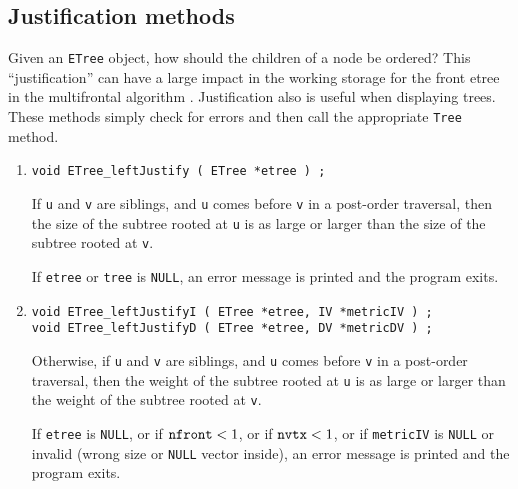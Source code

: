 \subsection{Justification methods}
\label{subsection:ETree:proto:justify}
\par
Given an {\tt ETree} object, 
how should the children of a node be ordered?
This ``justification'' can have a large impact in the working
storage for the front etree in the multifrontal algorithm
\cite{liu85-mfstorage}.
Justification also is useful when displaying trees.
These methods simply check for errors and then call the appropriate
{\tt Tree} method.
\par
\begin{enumerate}
\item
\begin{verbatim}
void ETree_leftJustify ( ETree *etree ) ;
\end{verbatim}
If {\tt u} and {\tt v} are siblings, and {\tt u} comes
before {\tt v} in a post-order traversal, then the size of the
subtree rooted at {\tt u} is as large or larger than the size of
the subtree rooted at {\tt v}.
\par {}
If {\tt etree} or {\tt tree} is {\tt NULL},
an error message is printed and the program exits.
\item
\begin{verbatim}
void ETree_leftJustifyI ( ETree *etree, IV *metricIV ) ;
void ETree_leftJustifyD ( ETree *etree, DV *metricDV ) ;
\end{verbatim}
Otherwise, if {\tt u} and {\tt v} are siblings, and {\tt u} comes
before {\tt v} in a post-order traversal, then the weight of the
subtree rooted at {\tt u} is as large or larger than the weight of
the subtree rooted at {\tt v}.
\par {}
If {\tt etree} is {\tt NULL},
or if ${\tt nfront} < 1$,
or if ${\tt nvtx} < 1$,
or if {\tt metricIV} is {\tt NULL} 
or invalid (wrong size or {\tt NULL} vector inside),
an error message is printed and the program exits.
\end{enumerate}
\par
